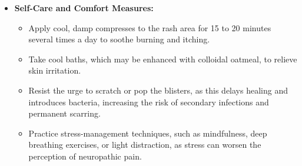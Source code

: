 \begin{itemize}
    \begin{itemize}
        \item Keep the shingles rash covered with clean, non-stick sterile bandages until all lesions have completely crusted over.
        \item Wash hands thoroughly and frequently with soap and warm water, especially after touching or dressing the rash.
        \item Avoid contact with vulnerable populations, including pregnant women who have not had chickenpox or the vaccine, premature or low-birth-weight infants, and individuals with weakened immune systems.
        \item Avoid swimming pools, contact sports, and shared hot tubs while the rash is in the vesicular stage.
    \end{itemize}
    \item \textbf{Self-Care and Comfort Measures:}
    \begin{itemize}
        \item Apply cool, damp compresses to the rash area for 15 to 20 minutes several times a day to soothe burning and itching.
        \item Take cool baths, which may be enhanced with colloidal oatmeal, to relieve skin irritation.
        \item Resist the urge to scratch or pop the blisters, as this delays healing and introduces bacteria, increasing the risk of secondary infections and permanent scarring.
        \item Practice stress-management techniques, such as mindfulness, deep breathing exercises, or light distraction, as stress can worsen the perception of neuropathic pain.
    \end{itemize}
\end{itemize}

